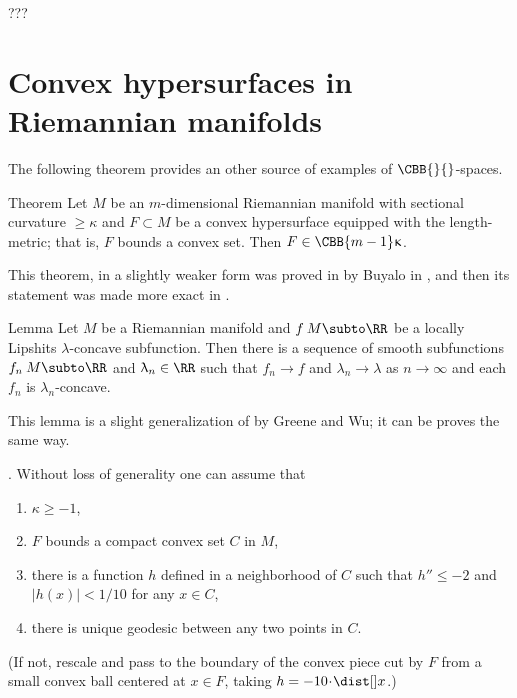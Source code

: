 ???
\qeds



\section{Convex hypersurfaces in Riemannian manifolds}

The following theorem provides an other source of examples of $\CBB{}{}$-spaces.

\begin{thm}{Theorem}\label{thm:buyalo} 
Let $M$ be an $m$-dimensional Riemannian manifold 
with sectional curvature $\ge \kappa$ 
and $F\subset M$ be a convex hypersurface equipped with the length-metric;
that is, $F$ bounds a convex set. 
Then $F\in\CBB{m-1}\kappa$.
\end{thm}

This theorem, in a slightly weaker form was proved in by Buyalo in \cite{buyalo:convex-surface}, 
and then its statement was made more exact in \cite{akp}.

\begin{thm}{Lemma}\label{lem:smoothing}
Let $M$ be a Riemannian manifold and $f\:M\subto\RR$ be a locally Lipshits $\lambda$-concave subfunction. 
Then there is a sequence of smooth subfunctions $f_n\:M\subto\RR$ and $\lambda_n\in\RR$ such that $f_n\to f$ and $\lambda_n\to \lambda$ as $n\to\infty$ and each $f_n$ is $\lambda_n$-concave.
\end{thm} 

This lemma is a slight generalization of \cite[Theorem 2]{greene-wu}
by Greene and Wu;
it can be proves the same way.

. 
Without loss of generality one can assume that 
\begin{enumerate}
\item \label{k>=-1}$\kappa\ge -1$, 
\item $F$ bounds a compact convex set $C$ in $M$, 
\item there is a function $h$ defined in a neighborhood of $C$ such that $h''\le -2$ and $|h(x)|<1/10$ for any $x\in C$,
\item \label{property:unique} there is unique geodesic between any two points in $C$. 
\end{enumerate}
(If not, rescale and pass to the boundary of the convex piece cut by $F$  from a small convex ball centered at $x\in F$, taking $h=-10\cdot\dist[{{}}]{x}{}{}$.)

